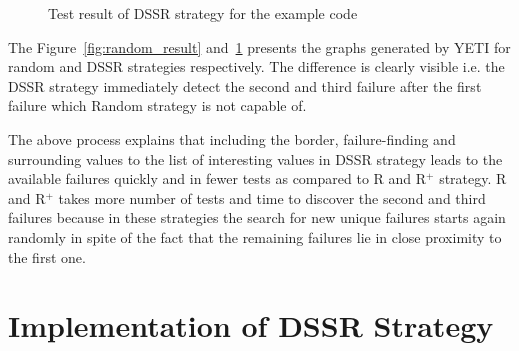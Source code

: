 \bigskip

\begin{figure}[H]
\centering
\setlength{\fboxsep}{0pt}%
\setlength{\fboxrule}{1pt}%
\bigskip
\caption{Test result of DSSR strategy for the example code}
\label{fig:dssr_result}
\end{figure}
\bigskip

The Figure~\ref{fig:random_result} and~\ref{fig:dssr_result} presents the graphs generated by YETI for random and DSSR strategies respectively. The difference is clearly visible i.e. the DSSR strategy immediately detect the second and third failure after the first failure which Random strategy is not capable of. 

The above process explains that including the border, failure-finding and surrounding values to the list of interesting values in DSSR strategy leads to the available failures quickly and in fewer tests as compared to R and R$^+$ strategy. R and R$^+$ takes more number of tests and time to discover the second and third failures because in these strategies the search for new unique failures starts again randomly in spite of the fact that the remaining failures lie in close proximity to the first one.







\section{Implementation of DSSR Strategy}\label{sec:imp}

